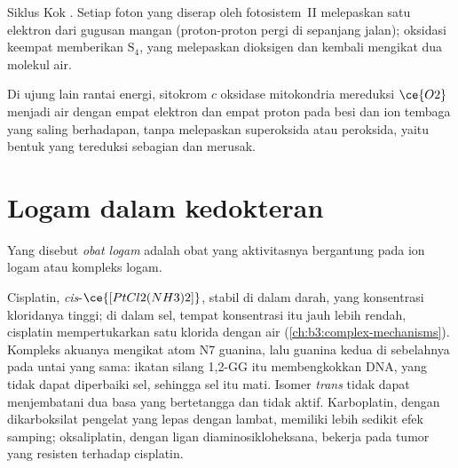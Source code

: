 \begin{omfigure}

{\small Siklus Kok . Setiap foton yang diserap oleh
fotosistem~II melepaskan satu elektron dari gugusan mangan (proton-proton
pergi di sepanjang jalan); oksidasi keempat memberikan $\mathrm S_4$, yang melepaskan dioksigen dan
kembali mengikat dua molekul air.}
\end{omfigure}

Di ujung lain rantai energi, sitokrom $c$ oksidase
mitokondria mereduksi $\ce{O2}$ menjadi air dengan empat elektron dan empat proton pada
besi  dan ion tembaga yang saling berhadapan, tanpa melepaskan superoksida atau peroksida,
yaitu bentuk yang tereduksi sebagian dan merusak.

\section{Logam dalam kedokteran}

\begin{definition}\label{def:b3:bioinorganic:metallodrug}
Yang disebut \emph{obat logam} adalah obat yang aktivitasnya bergantung pada
ion logam atau kompleks logam.
\end{definition}

Cisplatin, \textit{cis}-$\ce{[PtCl2(NH3)2]}$, stabil di dalam darah, yang konsentrasi kloridanya
tinggi; di dalam sel, tempat konsentrasi itu jauh lebih rendah, cisplatin mempertukarkan satu klorida dengan air
(\cref{ch:b3:complex-mechanisms}). Kompleks akuanya mengikat atom N7
guanina, lalu guanina kedua di sebelahnya pada untai yang sama: ikatan silang 1,2-GG
itu membengkokkan DNA, yang tidak dapat diperbaiki sel, sehingga sel itu mati. Isomer
\textit{trans} tidak dapat menjembatani dua basa yang bertetangga dan tidak aktif.
Karboplatin, dengan dikarboksilat pengelat yang lepas dengan lambat, memiliki lebih sedikit
efek samping; oksaliplatin, dengan ligan diaminosikloheksana, bekerja pada tumor
yang resisten terhadap cisplatin.

